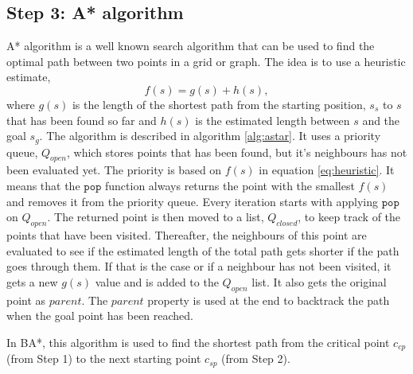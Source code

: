 \subsection{Step 3: A* algorithm}
A* algorithm is a well known search algorithm that can be used to find the optimal path between two points in a grid or graph. The idea is to use a heuristic estimate,
\begin{equation}
    \label{eq:heuristic}
    f(s) = g(s) + h(s),
\end{equation}
where $g(s)$ is the length of the shortest path from the starting position, $s_{s}$ to $s$ that has been found so far and $h(s)$ is the estimated length between $s$ and the goal $s_g$. The algorithm is described in algorithm \ref{alg:astar}. It uses a priority queue, $Q_{open}$, which stores points that has been found, but it's neighbours has not been evaluated yet. The priority is based on $f(s)$ in equation \ref{eq:heuristic}. It means that the $\texttt{pop}$ function always returns the point with the smallest $f(s)$ and removes it from the priority queue. Every iteration starts with applying $\texttt{pop}$ on $Q_{open}$. The returned point is then moved to a list, $Q_{closed}$, to keep track of the points that have been visited. Thereafter, the neighbours of this point are evaluated to see if the estimated length of the total path gets shorter if the path goes through them. If that is the case or if a neighbour has not been visited, it gets a new $g(s)$ value and is added to the $Q_{open}$ list. It also gets the original point as $parent$. The $parent$ property is used at the end to backtrack the path when the goal point has been reached.

In BA*, this algorithm is used to find the shortest path from the critical point $c_{cp}$ (from Step 1) to the next starting point $c_{sp}$ (from Step 2).

